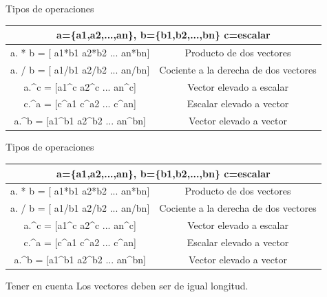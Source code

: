 \documentclass{bredelebeamer}
\begin{document}
\begin{frame}{Tipos de operaciones}
\begin{table}[]
\centering
\begin{tabular}{|c|c|}
\hline
\multicolumn{2}{|c|}{a=\{a1,a2,...,an\}, b=\{b1,b2,...,bn\} c=escalar}                                                                           \\ \hline
a. * b = {[} a1*b1 a2*b2 ... an*bn{]}                                                                  & Producto de dos vectores                \\ \hline
a. / b = {[} a1/b1 a2/b2 ... an/bn{]}                                                                  & Cociente a la derecha de dos vectores   \\ \hline
a.\textasciicircum{}c = {[}a1\textasciicircum{}c a2\textasciicircum{}c ... an\textasciicircum{}c{]}    & Vector elevado a escalar                \\ \hline
c.\textasciicircum{}a = {[}c\textasciicircum{}a1 c\textasciicircum{}a2 ... c\textasciicircum{}an{]}    & Escalar elevado a vector                \\ \hline
a.\textasciicircum{}b = {[}a1\textasciicircum{}b1 a2\textasciicircum{}b2 ... an\textasciicircum{}bn{]} & Vector elevado a vector                 \\ \hline
\end{tabular}
\end{table}
\end{frame}

\begin{frame}{Tipos de operaciones}
\begin{table}[]
\centering
\begin{tabular}{|c|c|}
\hline
\multicolumn{2}{|c|}{a=\{a1,a2,...,an\}, b=\{b1,b2,...,bn\} c=escalar}                                                                           \\ \hline
a. * b = {[} a1*b1 a2*b2 ... an*bn{]}                                                                  & Producto de dos vectores                \\ \hline
a. / b = {[} a1/b1 a2/b2 ... an/bn{]}                                                                  & Cociente a la derecha de dos vectores   \\ \hline
a.\textasciicircum{}c = {[}a1\textasciicircum{}c a2\textasciicircum{}c ... an\textasciicircum{}c{]}    & Vector elevado a escalar                \\ \hline
c.\textasciicircum{}a = {[}c\textasciicircum{}a1 c\textasciicircum{}a2 ... c\textasciicircum{}an{]}    & Escalar elevado a vector                \\ \hline
a.\textasciicircum{}b = {[}a1\textasciicircum{}b1 a2\textasciicircum{}b2 ... an\textasciicircum{}bn{]} & Vector elevado a vector                 \\ \hline
\end{tabular}
\end{table}
\begin{alertblock}{Tener en cuenta}
Los vectores deben ser de igual longitud.
\end{alertblock}
\end{frame}
\end{document}

